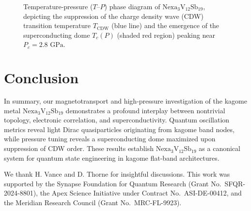 \documentclass[aps,prb,reprint,superscriptaddress,amsmath,amssymb,citeautoscript]{revtex4-2}
\begin{document}
\begin{figure}[t]
\centering
{}
\caption{\label{fig:phasediagram}Temperature-pressure ($T$--$P$) phase diagram of $\mathrm{Nexa}_{3}\mathrm{V}_{12}\mathrm{Sb}_{19}$, depicting the suppression of the charge density wave (CDW) transition temperature $T_{\text{CDW}}$ (blue line) and the emergence of the superconducting dome $T_c(P)$ (shaded red region) peaking near $P_c = 2.8\text{~GPa}$.}
\end{figure}

\section{Conclusion}
In summary, our magnetotransport and high-pressure investigation of the kagome metal $\mathrm{Nexa}_{3}\mathrm{V}_{12}\mathrm{Sb}_{19}$ demonstrates a profound interplay between nontrivial topology, electronic correlation, and superconductivity. Quantum oscillation metrics reveal light Dirac quasiparticles originating from kagome band nodes, while pressure tuning reveals a superconducting dome maximized upon suppression of CDW order. These results establish $\mathrm{Nexa}_{3}\mathrm{V}_{12}\mathrm{Sb}_{19}$ as a canonical system for quantum state engineering in kagome flat-band architectures.

\begin{acknowledgments}
We thank H. Vance and D. Thorne for insightful discussions. This work was supported by the Synapse Foundation for Quantum Research (Grant No.~SFQR-2024-8801), the Apex Science Initiative under Contract No.~ASI-DE-00412, and the Meridian Research Council (Grant No.~MRC-FL-9923).
\end{acknowledgments}
\end{document}
